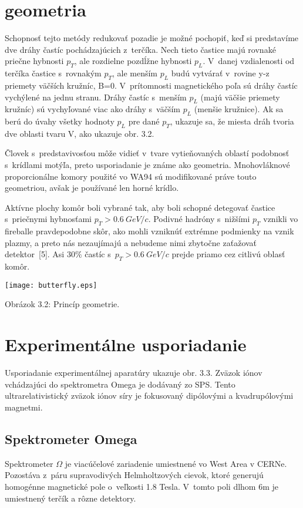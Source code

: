 \section{ geometria}
Schopnosť tejto metódy redukovať pozadie je možné pochopiť, keď si
predstavíme dve dráhy častíc pochádzajúcich z~terčíka. Nech tieto
častice majú rovnaké priečne hybnosti $p_{T}$, ale rozdielne pozdĺžne
hybnosti $p_{L}$. V~danej vzdialenosti od terčíka častice s~rovnakým
$p_{T}$, ale menším  $p_{L}$ budú vytvárať v~rovine y-z priemety
väčších kružníc, B=0. V~prítomnosti magnetického poľa sú dráhy častíc
vychýlené na jednu stranu. Dráhy častíc s~menším  $p_{L}$ (majú väčšie
priemety kružníc) sú vychyľované viac ako dráhy s~väčším  $p_{L}$
(menšie kružnice). Ak sa berú do úvahy všetky hodnoty  $p_{L}$ pre dané
$p_{T}$, ukazuje sa, že miesta dráh tvoria dve oblasti tvaru V, ako
ukazuje obr. 3.2.

Človek s~predstavivosťou môže vidieť v~tvare vytieňovaných oblastí podobnosť
s~krídlami motýľa, preto usporiadanie  je známe ako  geometria.
Mnohovláknové proporcionálne komory použité vo WA94 sú modifikované práve
touto geometriou, avšak je používané len horné krídlo.

Aktívne plochy komôr boli vybrané tak, aby boli schopné detegovať častice
s~priečnymi hybnosťami $p_{T}>0.6\: GeV/c$. Podivné hadróny s~nižšími $p_{T}$
vznikli vo fireballe pravdepodobne skôr, ako mohli vzniknúť
extrémne podmienky na vznik plazmy, a preto nás nezaujímajú a nebudeme nimi
zbytočne zaťažovať detektor~[5]. Asi $30\%$ častíc s~$p_{T}>0.6\: GeV/c$
prejde priamo cez citlivú oblasť komôr.


\newpage
\vspace*{1cm}
\begin{center}
  \texttt{[image: butterfly.eps]}
\end{center}
\begin{center}
  Obrázok 3.2: Princíp  geometrie.
\end{center}

\newpage
\section{Experimentálne usporiadanie}
Usporiadanie experimentálnej aparatúry ukazuje obr. 3.3. Zväzok iónov
vchádzajúci do spektrometra Omega je dodávaný zo SPS.
Tento  ultrarelativistický zväzok
iónov síry je fokusovaný dipólovými a kvadrupólovými magnetmi.
\subsection{Spektrometer Omega}
Spektrometer ${\Omega}$ je viacúčelové zariadenie umiestnené vo West Area v
CERNe.  Pozostáva  z~páru supravodivých Helmholtzových cievok, ktoré generujú
homogénne magnetické pole o~veľkosti 1.8 Tesla. V~tomto poli dlhom 6m je
umiestnený terčík a rôzne detektory.

